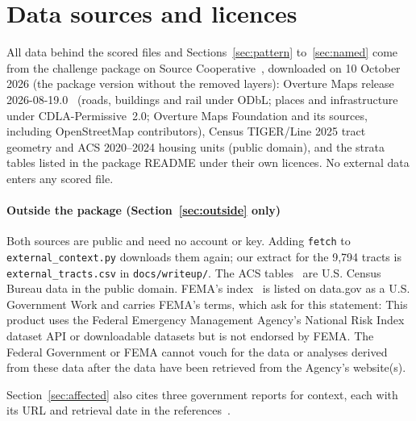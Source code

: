 \documentclass[10pt,twocolumn,a4paper]{article}
\newcommand{\code}[1]{\texttt{\small #1}}
\begin{document}
\section{Data sources and licences}
\label{app:data}
All data behind the scored files and Sections~\ref{sec:pattern} to~\ref{sec:named} come from the challenge package on Source Cooperative~\cite{readme}, downloaded on 10 October 2026 (the package
version without the removed layers): Overture Maps release 2026-08-19.0~\cite{overture} (roads, buildings and rail under
ODbL; places and infrastructure under CDLA-Permissive~2.0; \textcopyright{} Overture Maps Foundation and its sources,
including OpenStreetMap contributors), Census TIGER/Line 2025 tract geometry and ACS 2020--2024 housing units (public
domain), and the strata tables listed in the package README under their own licences. No external data enters any
scored file.

\paragraph{Outside the package (Section~\ref{sec:outside} only)} Both sources are public and need no account or key.
Adding \code{fetch} to \code{external\_context.py} downloads them again; our extract for the 9,794 tracts is
\code{external\_tracts.csv} in \code{docs/writeup/}. The ACS tables~\cite{acs} are U.S. Census Bureau data in the public domain.
FEMA's index~\cite{nri} is listed on data.gov as a U.S. Government Work and carries FEMA's terms, which ask for this
statement: This product uses the Federal Emergency Management Agency's National Risk Index dataset API or downloadable
datasets but is not endorsed by FEMA. The Federal Government or FEMA cannot vouch for the data or analyses derived from
these data after the data have been retrieved from the Agency's website(s).

Section~\ref{sec:affected} also cites three government reports for context, each with its URL and retrieval date in the
references~\cite{caloes,grandjury,harvey}.
\end{document}
